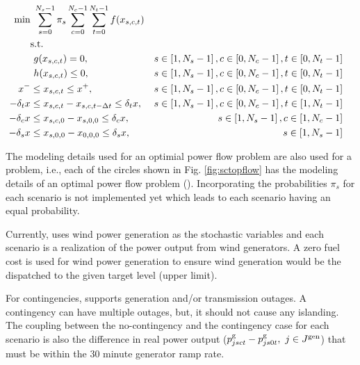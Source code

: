 \begin{align}
\centering
\text{min}&~\sum_{s=0}^{N_s-1}\pi_s\sum_{c=0}^{N_c-1}\sum_{t=0}^{N_t-1}f(x_{s,c,t})&  \label{eq:sctopflow_start}\\
&\text{s.t.}& \nonumber \\
&~g(x_{s,c,t}) = 0,                                        &s \in \left[1,N_s-1\right],c \in \left[0,N_c-1\right], t \in \left[0,N_t-1\right]& \\
&~h(x_{s,c,t}) \le 0,                                      &s \in \left[1,N_s-1\right],c \in \left[0,N_c-1\right], t \in \left[0,N_t-1\right]& \\
x^- & \le x_{s,c,t} \le x^+,                               &s \in \left[1,N_s-1\right],c \in \left[0,N_c-1\right], t\in \left[0,N_t-1\right]& \\
-\delta_t{x} & \le x_{s,c,t} - x_{s,c,t-\Delta{t}} \le \delta_t{x},&s \in \left[1,N_s-1\right],c \in \left[0,N_c-1\right], t \in \left[1,N_t-1\right]& \label{eq:sctopflow_time_coupling}\\
-\delta_c{x} & \le x_{s,c,0} - x_{s,0,0} \le \delta_c{x},&s \in \left[1,N_s-1\right],c \in \left[1,N_c-1\right]&
\label{eq:sctopflow_contingency_coupling} \\
-\delta_s{x} & \le x_{s,0,0} - x_{0,0,0} \le \delta_s{x},&s \in \left[1,N_s-1\right]&
\label{eq:sctopflow_end}
\end{align}

The modeling details used for an optimial power flow problem are also used for a {\sopflow} problem, i.e., each of the circles shown in Fig. \ref{fig:sctopflow} has the modeling details of an optimal power flow problem (\opflow). Incorporating the probabilities $\pi_s$ for each scenario is not implemented yet which leads to each scenario having an equal probability. 

Currently, \sopflow uses wind power generation as the stochastic variables and each scenario is a realization of the power output from wind generators. A zero fuel cost is used for wind power generation to ensure wind generation would be the dispatched to the given target level (upper limit). 

For contingencies, \sopflow supports generation and/or transmission outages. A contingency can have multiple outages, but, it should not cause any islanding. The coupling between the no-contingency and the contingency case for each scenario is also the difference in real power output ($p_{jsct}^{\text{g}} - p_{js0t}^{\text{g}},~ j \in J^\text{gen}$) that must be within the 30 minute generator ramp rate.

